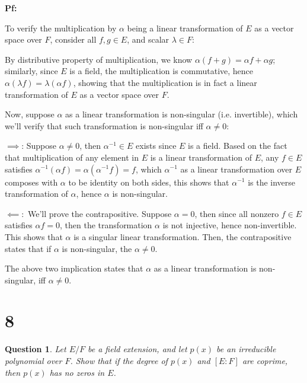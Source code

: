 \documentclass{article}
\newtheorem{question}{Question}
\begin{document}
\textbf{Pf:}

To verify the multiplication by $\alpha$ being a linear transformation of $E$ as a vector space over $F$, consider all $f,g\in E$, and scalar $\lambda\in F$:

By distributive property of multiplication, we know $\alpha(f+g)=\alpha f+\alpha g$; similarly, since $E$ is a field, the multiplication is commutative, hence $\alpha(\lambda f)=\lambda (\alpha f)$,
showing that the multiplication is in fact a linear transformation of $E$ as a vector space over $F$.

\hfil

Now, suppose $\alpha$ as a linear transformation is non-singular (i.e. invertible), which we'll verify that such transformation is non-singular iff $\alpha\neq 0$:

$\implies$: Suppose $\alpha\neq 0$, then $\alpha^{-1}\in E$ exists since $E$ is a field. Based on the fact that multiplication of any element in $E$ is a linear transformation of $E$,
any $f\in E$ satisfies $\alpha^{-1}(\alpha f) = \alpha(\alpha^{-1}f)=f$, which $\alpha^{-1}$ as a linear transformation over $E$ composes with $\alpha$ to be identity on both sides,
this shows that $\alpha^{-1}$ is the inverse transformation of $\alpha$, hence $\alpha$ is non-singular.

$\impliedby:$ We'll prove the contrapositive. Suppose $\alpha=0$, then since all nonzero $f\in E$ satisfies $\alpha f = 0$, then the transformation $\alpha$ is not injective,
hence non-invertible. This shows that $\alpha$ is a singular linear transformation.
Then, the contrapositive states that if $\alpha$ is non-singular, the $\alpha\neq 0$.

The above two implication states that $\alpha$ as a linear transformation is non-singular, iff $\alpha\neq 0$.

\hfil

\hfil

\section*{8}
\begin{myBox}[]{}
    \begin{question}
        Let $E/F$ be a field extension, and let $p(x)$ be an irreducible polynomial over $F$. 
        Show that if the degree of $p(x)$ and $[E:F]$ are coprime, then $p(x)$ has no zeros in $E$.
    \end{question}
\end{myBox}
\end{document}
